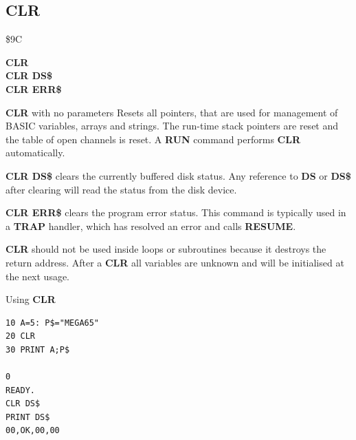 \subsection{CLR}
\begin{description}[leftmargin=2cm,style=nextline]
\item [Token:] \$9C
\item [Format:] {\bf CLR}        \\
                {\bf CLR DS\$}   \\
                {\bf CLR ERR\$}
\item [Usage:] {\bf CLR} with no parameters Resets all pointers, that
               are used for management of BASIC variables, arrays
               and strings. The run-time stack pointers are reset
               and the table of open channels is reset.
               A {\bf RUN} command performs {\bf CLR} automatically.

               {\bf CLR DS\$} clears the currently buffered disk status.
               Any reference to {\bf DS} or {\bf DS\$} after clearing
               will read the status from the disk device.

               {\bf CLR ERR\$} clears the program error status.
               This command is typically used in a {\bf TRAP} handler,
               which has resolved an error and calls {\bf RESUME}.

\item [Remarks:] {\bf CLR} should not be used inside loops or
               subroutines because it destroys the return address.
               After a {\bf CLR} all variables are unknown and will
               be initialised at the next usage.

\item [Example:] Using {\bf CLR}
\begin{tcolorbox}[colback=black,coltext=white]
\verbatimfont{\codefont}
\begin{verbatim}
10 A=5: P$="MEGA65"
20 CLR
30 PRINT A;P$

0
READY.
CLR DS$
PRINT DS$
00,OK,00,00
\end{verbatim}
\end{tcolorbox}
\end{description}


\newpage
